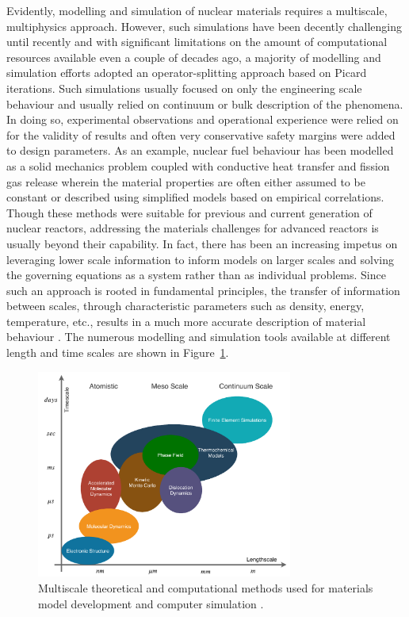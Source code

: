 	 Evidently, modelling and simulation of nuclear materials requires a multiscale, multiphysics approach. However, such simulations have been decently challenging until recently and with significant limitations on the amount of computational resources available even a couple of decades ago, a majority of modelling and simulation efforts adopted an operator-splitting approach based on Picard iterations. Such simulations usually focused on only the engineering scale behaviour and usually relied on continuum or bulk description of the phenomena. In doing so, experimental observations and operational experience were relied on for the validity of results and often very conservative safety margins were added to design parameters. As an example, nuclear fuel behaviour has been modelled as a solid mechanics problem coupled with conductive heat transfer and fission gas release wherein the material properties are often either assumed to be constant or described using simplified models based on empirical correlations. Though these methods were suitable for previous and current generation of nuclear reactors, addressing the materials challenges for advanced reactors is usually beyond their capability. In fact, there has been an increasing impetus on leveraging lower scale information to inform models on larger scales and solving the governing equations as a system rather than as individual problems.  Since such an approach is rooted in fundamental principles, the transfer of information between scales, through characteristic parameters such as density, energy, temperature, etc., results in a much more accurate description of material behaviour \cite{STAN200920}. The numerous modelling and simulation tools available at different length and time scales are shown in Figure~\ref{fig:multiphys}.
	\begin{figure}[htb]
		\centering
		\includegraphics[width=0.75\textwidth]{figures/chapter-1/Multiphysics.pdf}
		\caption[Multiscale methods used for materials modelling simulation]{Multiscale theoretical and computational methods used for materials model development and computer simulation \cite{STAN200920}.}
		\label{fig:multiphys}
	\end{figure}
	
